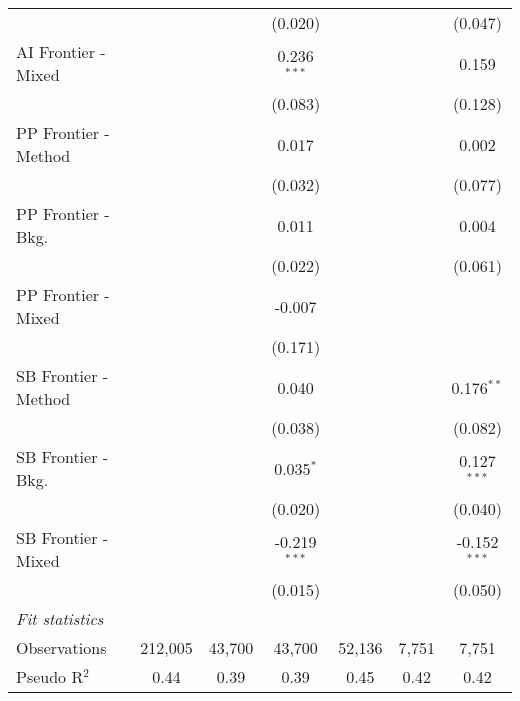 \begin{tabular}{lcccccc}
                        &               &               & (0.020)        &               &         & (0.047)\\   
   AI Frontier - Mixed  &               &               & 0.236$^{***}$  &               &         & 0.159\\   
                        &               &               & (0.083)        &               &         & (0.128)\\   
   PP Frontier - Method &               &               & 0.017          &               &         & 0.002\\   
                        &               &               & (0.032)        &               &         & (0.077)\\   
   PP Frontier - Bkg.   &               &               & 0.011          &               &         & 0.004\\   
                        &               &               & (0.022)        &               &         & (0.061)\\   
   PP Frontier - Mixed  &               &               & -0.007         &               &         &   \\   
                        &               &               & (0.171)        &               &         &   \\   
   SB Frontier - Method &               &               & 0.040          &               &         & 0.176$^{**}$\\   
                        &               &               & (0.038)        &               &         & (0.082)\\   
   SB Frontier - Bkg.   &               &               & 0.035$^{*}$    &               &         & 0.127$^{***}$\\   
                        &               &               & (0.020)        &               &         & (0.040)\\   
   SB Frontier - Mixed  &               &               & -0.219$^{***}$ &               &         & -0.152$^{***}$\\   
                        &               &               & (0.015)        &               &         & (0.050)\\   
   \midrule
   \emph{Fit statistics}\\
   Observations         & 212,005       & 43,700        & 43,700         & 52,136        & 7,751   & 7,751\\  
   Pseudo R$^2$         & 0.44          & 0.39          & 0.39           & 0.45          & 0.42    & 0.42\\  
   

\end{tabular}
